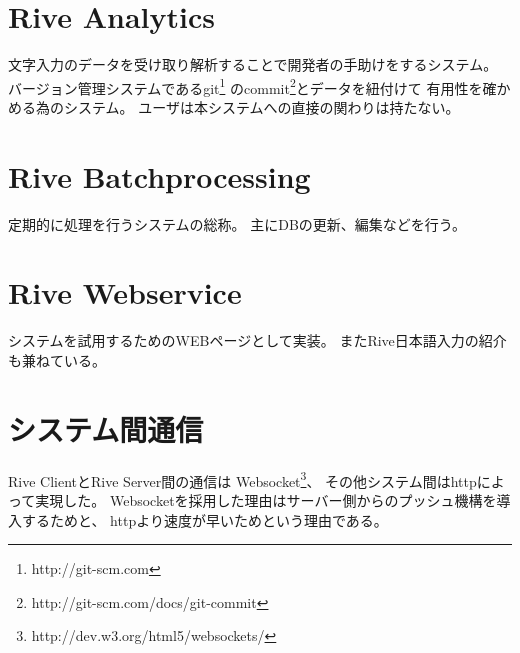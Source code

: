 \section{Rive Analytics}
文字入力のデータを受け取り解析することで開発者の手助けをするシステム。
バージョン管理システムであるgit\footnote{http://git-scm.com}
のcommit\footnote{http://git-scm.com/docs/git-commit}とデータを紐付けて
有用性を確かめる為のシステム。
ユーザは本システムへの直接の関わりは持たない。

\section{Rive Batchprocessing}
定期的に処理を行うシステムの総称。
主にDBの更新、編集などを行う。

\section{Rive Webservice}
システムを試用するためのWEBページとして実装。
またRive日本語入力の紹介も兼ねている。

\section{システム間通信}
Rive ClientとRive Server間の通信は
Websocket\footnote{http://dev.w3.org/html5/websockets/}、
その他システム間はhttpによって実現した。
Websocketを採用した理由はサーバー側からのプッシュ機構を導入するためと、
httpより速度が早いためという理由である。\cite{websocket}
